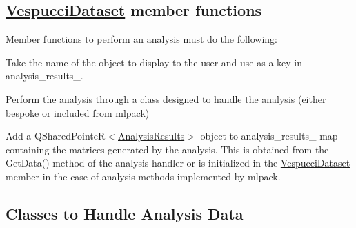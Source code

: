 \subsection*{{\ttfamily \hyperlink{class_vespucci_dataset}{Vespucci\+Dataset}} member functions }

Member functions to perform an analysis must do the following\+:
\begin{DoxyItemize}
\item Take the name of the object to display to the user and use as a key in {\ttfamily analysis\+\_\+results\+\_\+}.
\item Perform the analysis through a class designed to handle the analysis (either bespoke or included from mlpack)
\item Add a {\ttfamily Q\+Shared\+PointeR$<$\hyperlink{class_analysis_results}{Analysis\+Results}$>$} object to {\ttfamily analysis\+\_\+results\+\_\+} map containing the matrices generated by the analysis. This is obtained from the {\ttfamily Get\+Data()} method of the analysis handler or is initialized in the {\ttfamily \hyperlink{class_vespucci_dataset}{Vespucci\+Dataset}} member in the case of analysis methods implemented by mlpack.
\end{DoxyItemize}

\subsection*{Classes to Handle Analysis Data }

